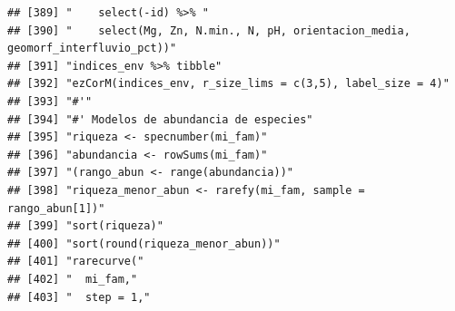 \documentclass[11pt,]{article}
\begin{document}
\begin{verbatim}
## [389] "    select(-id) %>% "                                                                                                                                                  
## [390] "    select(Mg, Zn, N.min., N, pH, orientacion_media, geomorf_interfluvio_pct))"                                                                                        
## [391] "indices_env %>% tibble"                                                                                                                                                
## [392] "ezCorM(indices_env, r_size_lims = c(3,5), label_size = 4)"                                                                                                             
## [393] "#'"                                                                                                                                                                    
## [394] "#' Modelos de abundancia de especies"                                                                                                                                  
## [395] "riqueza <- specnumber(mi_fam)"                                                                                                                                         
## [396] "abundancia <- rowSums(mi_fam)"                                                                                                                                         
## [397] "(rango_abun <- range(abundancia))"                                                                                                                                     
## [398] "riqueza_menor_abun <- rarefy(mi_fam, sample = rango_abun[1])"                                                                                                          
## [399] "sort(riqueza)"                                                                                                                                                         
## [400] "sort(round(riqueza_menor_abun))"                                                                                                                                       
## [401] "rarecurve("                                                                                                                                                            
## [402] "  mi_fam,"                                                                                                                                                             
## [403] "  step = 1,"                                                                                                                                                           

\end{verbatim}
\end{document}
